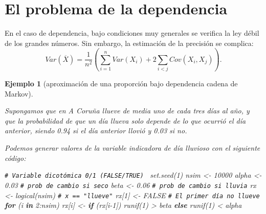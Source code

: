 \documentclass[
]{book}
\newenvironment{Shaded}{\begin{snugshade}}{\end{snugshade}}
\newcommand{\CommentTok}[1]{\textcolor[rgb]{0.56,0.35,0.01}{\textit{#1}}}
\newcommand{\ConstantTok}[1]{\textcolor[rgb]{0.00,0.00,0.00}{#1}}
\newcommand{\ControlFlowTok}[1]{\textcolor[rgb]{0.13,0.29,0.53}{\textbf{#1}}}
\newcommand{\DecValTok}[1]{\textcolor[rgb]{0.00,0.00,0.81}{#1}}
\newcommand{\FloatTok}[1]{\textcolor[rgb]{0.00,0.00,0.81}{#1}}
\newcommand{\FunctionTok}[1]{\textcolor[rgb]{0.00,0.00,0.00}{#1}}
\newcommand{\NormalTok}[1]{#1}
\newcommand{\OtherTok}[1]{\textcolor[rgb]{0.56,0.35,0.01}{#1}}
\newcommand{\SpecialCharTok}[1]{\textcolor[rgb]{0.00,0.00,0.00}{#1}}
\theoremstyle{break}
\newtheorem{example}{Ejemplo}[chapter]
\theoremstyle{nonumberplain}
\renewcommand{\CommentTok}[1]{\textcolor[rgb]{0.41,0.41,0.41}{\texttt{#1}}}
\begin{document}
\hypertarget{el-problema-de-la-dependencia}{%
\section{El problema de la dependencia}\label{el-problema-de-la-dependencia}}

En el caso de dependencia, bajo condiciones muy generales se verifica la ley débil de los grandes números.
Sin embargo, la estimación de la precisión se complica:
\[Var\left( \overline{X}\right) =\frac{1}{n^{2}}\left( 
\sum_{i=1}^{n}Var\left( X_{i} \right) + 2\sum_{i<j}Cov\left( X_{i},X_{j}\right) \right).\]

\begin{example}[aproximación de una proporción bajo dependencia cadena de Markov]
\protect\hypertarget{exm:mmc}{}\label{exm:mmc}

Supongamos que en A Coruña llueve de media uno de cada tres días al año,
y que la probabilidad de que un día llueva solo depende de lo que ocurrió el día anterior,
siendo 0.94 si el día anterior llovió y 0.03 si no.

Podemos generar valores de la variable indicadora de día lluvioso con el siguiente código:

\begin{Shaded}
\begin{Highlighting}[]
\CommentTok{\# Variable dicotómica 0/1 (FALSE/TRUE)  }
\FunctionTok{set.seed}\NormalTok{(}\DecValTok{1}\NormalTok{)}
\NormalTok{nsim }\OtherTok{\textless{}{-}} \DecValTok{10000}
\NormalTok{alpha }\OtherTok{\textless{}{-}} \FloatTok{0.03} \CommentTok{\# prob de cambio si seco}
\NormalTok{beta }\OtherTok{\textless{}{-}} \FloatTok{0.06}  \CommentTok{\# prob de cambio si lluvia}
\NormalTok{rx }\OtherTok{\textless{}{-}} \FunctionTok{logical}\NormalTok{(nsim) }\CommentTok{\# x == "llueve"}
\NormalTok{rx[}\DecValTok{1}\NormalTok{] }\OtherTok{\textless{}{-}} \ConstantTok{FALSE} \CommentTok{\# El primer día no llueve}
\ControlFlowTok{for}\NormalTok{ (i }\ControlFlowTok{in} \DecValTok{2}\SpecialCharTok{:}\NormalTok{nsim)}
\NormalTok{  rx[i] }\OtherTok{\textless{}{-}} \ControlFlowTok{if}\NormalTok{ (rx[i}\DecValTok{{-}1}\NormalTok{]) }\FunctionTok{runif}\NormalTok{(}\DecValTok{1}\NormalTok{) }\SpecialCharTok{\textgreater{}}\NormalTok{ beta }\ControlFlowTok{else} \FunctionTok{runif}\NormalTok{(}\DecValTok{1}\NormalTok{) }\SpecialCharTok{\textless{}}\NormalTok{ alpha}
\end{Highlighting}
\end{Shaded}


\end{example}
\end{document}
